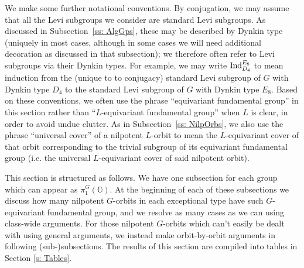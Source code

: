 \documentclass[11pt]{amsart}
\renewcommand{\O}{{\mathbb O}}
\newcommand{\ad}{{\operatorname{ad}}}
\renewcommand{\sc}{\operatorname{sc}}
\newcommand{\Ind}{{{\mbox{\rm Ind}}}}
\numberwithin{equation}{section}
\begin{document}

	
	We make some further notational conventions. By conjugation, we may assume that all the Levi subgroups we consider are standard Levi subgroups. As discussed in Subsection~\ref{ss: AlgGps}, these may be described by Dynkin type (uniquely in most cases, although in some cases we will need additional decoration as discussed in that subsection); we therefore often refer to Levi subgroups via their Dynkin types. For example, we may write $\Ind_{D_4}^{E_8}$ to mean induction from the (unique to to conjugacy) standard Levi subgroup of $G$ with Dynkin type $D_4$ to the standard Levi subgroup of $G$ with Dynkin type $E_8$. Based on these conventions, we often use the phrase ``equivariant fundamental group'' in this section rather than ``$L$-equivariant fundamental group'' when $L$ is clear, in order to avoid undue clutter. As in Subsection~\ref{ss: NilpOrbs}, we also use the phrase ``universal cover'' of a nilpotent $L$-orbit to mean the $L$-equivariant cover of that orbit corresponding to the trivial subgroup of its equivariant fundamental group (i.e. the universal $L$-equivariant cover of said nilpotent orbit).
	
	This section is structured as follows. We have one subsection for each group which can appear as $\pi_1^G(\O)$. At the beginning of each of these subsections we discuss how many nilpotent $G$-orbits in each exceptional type have such $G$-equivariant fundamental group, and we resolve as many cases as we can using class-wide arguments. For those nilpotent $G$-orbits which can't easily be dealt with using general arguments, we instead make orbit-by-orbit arguments in following (sub-)subsections. The results of this section are compiled into tables in Section \ref{s: Tables}.
	
\end{document}
